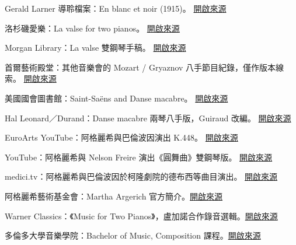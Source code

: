 \documentclass[UTF8,12pt,a4paper,fontset=none]{ctexart}
\begin{document}
\begin{enumerate}[label={[\arabic*]},leftmargin=*,itemsep=6pt,font=\small]
\item Gerald Larner 導聆檔案：En blanc et noir (1915)。 \href{https://geraldlarner.com/work/debussy-en-blanc-et-noir-1915}{開啟來源}

\item 洛杉磯愛樂：La valse for two pianos。 \href{https://www.laphil.com/works/la-valse-for-two-pianos}{開啟來源}

\item Morgan Library：La valse 雙鋼琴手稿。 \href{https://www.themorgan.org/music-manuscripts-and-printed-music/115543}{開啟來源}

\item 首爾藝術殿堂：其他音樂會的 Mozart / Gryaznov 八手節目紀錄，僅作版本線索。 \href{https://www.sac.or.kr/site/main/show/show_view?SN=37377\&tab=5}{開啟來源}

\item 美國國會圖書館：Saint-Saëns and Danse macabre。 \href{https://blogs.loc.gov/nls-music-notes/2022/10/song-stories-camille-saint-sans-and-danse-macabre/}{開啟來源}

\item Hal Leonard／Durand：Danse macabre 兩琴八手版，Guiraud 改編。 \href{https://www.halleonard.com/product/50561382/danse-macabre-op-40-poeme-symphonique}{開啟來源}

\item EuroArts YouTube：阿格麗希與巴倫波因演出 K.448。 \href{https://www.youtube.com/watch?v=USl7qUWU33k}{開啟來源}

\item YouTube：阿格麗希與 Nelson Freire 演出《圓舞曲》雙鋼琴版。 \href{https://www.youtube.com/watch?v=Q0Qo1anGvfQ}{開啟來源}

\item medici.tv：阿格麗希與巴倫波因於柯隆劇院的德布西等曲目演出。 \href{https://www.medici.tv/en/others/martha-argerich-and-daniel-barenboim-piano-duos-teatro-colon}{開啟來源}

\item 阿格麗希藝術基金會：Martha Argerich 官方簡介。\href{https://argerich-mf.jp/en/artist/martha-argerich}{開啟來源}

\item Warner Classics：《Music for Two Pianos》，盧加諾合作錄音選輯。\href{https://www.warnerclassics.com/release/music-two-pianos}{開啟來源}

\item 多倫多大學音樂學院：Bachelor of Music, Composition 課程。\href{https://music.utoronto.ca/programs/undergraduate/classical/composition}{開啟來源}


\end{enumerate}
\end{document}
